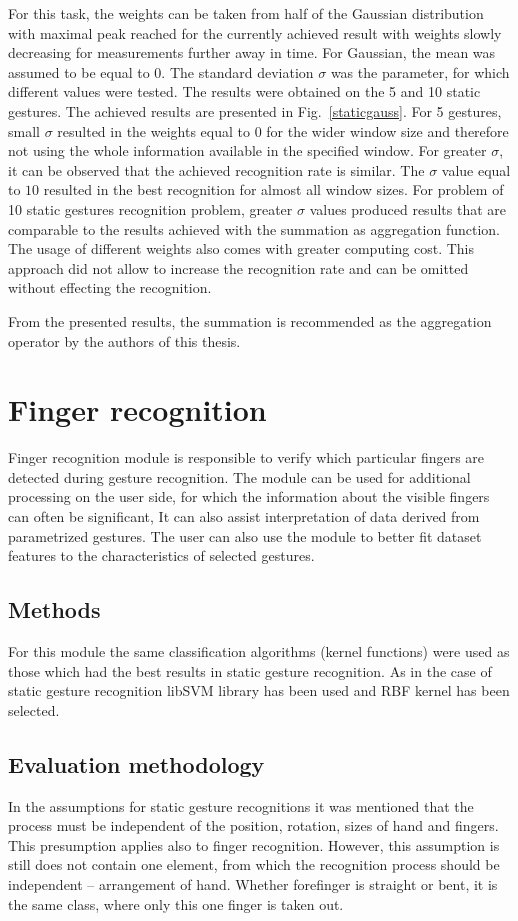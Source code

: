 For this task, the weights can be taken from half of the Gaussian distribution with maximal peak reached for the currently achieved result with weights slowly decreasing for measurements further away in time.
For Gaussian, the mean was assumed to be equal to $0$.
The standard deviation $\sigma$ was the parameter, for which different values were tested.
The results were obtained on the 5 and 10 static gestures.
The achieved results are presented in Fig.~\ref{staticgauss}.
For 5 gestures, small $\sigma$ resulted in the weights equal to $0$ for the wider window size and therefore not using the whole information available in the specified window. 
For greater $\sigma$, it can be observed that the achieved recognition rate is similar.
The $\sigma$ value equal to $10$ resulted in the best recognition for almost all window sizes.
For problem of 10 static gestures recognition problem, greater $\sigma$ values produced results that are comparable to the results achieved with the summation as aggregation function.
The usage of different weights also comes with greater computing cost.
This approach did not allow to increase the recognition rate and can be omitted without effecting the recognition.

From the presented results, the summation is recommended as the aggregation operator by the authors of this thesis.


\section{Finger recognition} 
Finger recognition module is responsible to verify which particular fingers are detected during gesture recognition. The module can be used for additional processing on the user side, for which the information about the visible fingers can often be significant, It can also assist interpretation of data derived from parametrized gestures. The user can also use the module to better fit dataset features to the characteristics of selected gestures.
\subsection{Methods}
For this module the same classification algorithms (kernel functions) were used as those which had the best results in static gesture recognition. As in the case of static gesture recognition libSVM library has been used and RBF kernel has been selected.
\subsection{Evaluation methodology}
In the assumptions for static gesture recognitions it was mentioned that the process must be independent of the position, rotation, sizes of hand and fingers. This presumption applies also to finger recognition. However, this assumption is still does not contain one element, from which the recognition process should be independent -- arrangement of hand. Whether forefinger is straight or bent, it is the same class, where only this one finger is taken out.

